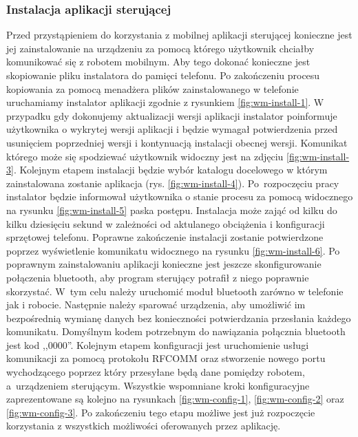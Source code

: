 \subsubsection{Instalacja aplikacji sterującej}
Przed przystąpieniem do korzystania z mobilnej aplikacji sterującej konieczne
jest jej zainstalowanie na urządzeniu za pomocą którego użytkownik chciałby
komunikować się z robotem mobilnym. Aby tego dokonać konieczne jest skopiowanie
pliku instalatora do pamięci telefonu. Po zakończeniu procesu kopiowania za
pomocą menadżera plików zainstalowanego w telefonie uruchamiamy instalator
aplikacji zgodnie z rysunkiem \ref{fig:wm-install-1}. W przypadku gdy dokonujemy aktualizacji wersji
aplikacji instalator poinformuje użytkownika o wykrytej wersji aplikacji i będzie
wymagał potwierdzenia przed usunięciem poprzedniej wersji i kontynuacją
instalacji obecnej wersji. Komunikat którego może się spodziewać użytkownik
widoczny jest na zdjęciu \ref{fig:wm-install-3}. Kolejnym etapem instalacji
będzie wybór katalogu docelowego w którym zainstalowana zostanie aplikacja
(rys. \ref{fig:wm-install-4}). Po~rozpoczęciu pracy instalator będzie informował
użytkownika o stanie procesu za pomocą widocznego na rysunku
\ref{fig:wm-install-5} paska postępu. Instalacja może zająć od kilku do kilku
dziesięciu sekund w zależności od aktulanego obciążenia i konfiguracji
sprzętowej telefonu. Poprawne zakończenie instalacji zostanie potwierdzone poprzez wyświetlenie
komunikatu widocznego na rysunku \ref{fig:wm-install-6}. Po poprawnym
zainstalowaniu aplikacji konieczne jest jeszcze skonfigurowanie połączenia
bluetooth, aby program sterujący potrafił z niego poprawnie skorzystać. 
W~tym celu należy uruchomić moduł bluetooth zarówno w telefonie jak i robocie.
Następnie należy sparować urządzenia, aby umożliwić im bezpośrednią wymianę
danych bez konieczności potwierdzania przesłania każdego komunikatu. Domyślnym
kodem potrzebnym do nawiązania połącznia bluetooth jest kod ,,0000''. Kolejnym
etapem konfiguracji jest uruchomienie usługi komunikacji za pomocą
protokołu RFCOMM oraz stworzenie nowego portu wychodzącego poprzez który
przesyłane będą dane pomiędzy robotem, a~urządzeniem sterującym. Wszystkie
wspomniane kroki konfiguracyjne zaprezentowane są kolejno na rysunkach
\ref{fig:wm-config-1}, \ref{fig:wm-config-2} oraz \ref{fig:wm-config-3}. Po
zakończeniu tego etapu możliwe jest już rozpoczęcie korzystania z wszystkich
możliwości oferowanych przez aplikację.

